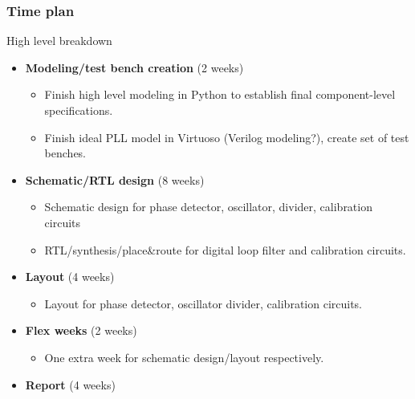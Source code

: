\documentclass[t, screen, aspectratio=43]{beamer}
\begin{document}
\begin{frame}
	\frametitle{Time plan}
	\begin{block}{High level breakdown}
		\begin{itemize}
			\footnotesize
			\item \textbf{Modeling/test bench creation} (2 weeks)
			\begin{itemize}
				\footnotesize
				\item Finish high level modeling in Python to establish final component-level specifications.
				\item Finish ideal PLL model in Virtuoso (Verilog modeling?), create set of test benches.
			\end{itemize} 
			\item \textbf{Schematic/RTL design} (8 weeks)
			\begin{itemize}
				\footnotesize
				\item Schematic design for phase detector, oscillator, divider, calibration circuits
				\item RTL/synthesis/place\&route for digital loop filter and calibration circuits.
			\end{itemize} 
			\item \textbf{Layout} (4 weeks)
			\begin{itemize}
				\footnotesize
				\item Layout for phase detector, oscillator divider, calibration circuits.
			\end{itemize} 
		\item \textbf{Flex weeks} (2 weeks)
			\begin{itemize}
				\footnotesize
				\item One extra week for schematic design/layout respectively.
			\end{itemize} 
			\item \textbf{Report} (4 weeks)
		\end{itemize}    
	\end{block}
\end{frame}
\end{document}
